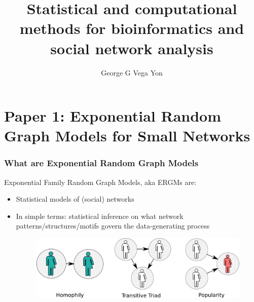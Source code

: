 \documentclass[aspectratio=169, 10pt]{beamer}
\title[Stat. Comp. Bioinf \& SocNets.]{Statistical and computational methods for bioinformatics and social network analysis\linebreak{\small or how did I learn to stop worrying and love the bomb}}
\author[GGVY]{George G Vega Yon}
\institute[USC-PREVMED]{University of Southern California, Department of Preventive Medicine}
\def\cursection{\frame{\tableofcontents[current]}}
\begin{document}


\begin{frame}[noframenumbering]
\maketitle
\end{frame}

\section{Paper 1: Exponential Random Graph Models for Small Networks}
\cursection

\begin{frame}
\frametitle{What are Exponential Random Graph Models}

Exponential Family Random Graph Models, aka ERGMs are:\pause

\begin{itemize}
\item Statistical models of (social) networks\pause
\item In simple terms: statistical inference on what network patterns/structures/motifs
govern the data-generating process
\begin{figure}
\includegraphics[width=.6\linewidth]{friendly-terms.pdf}
\end{figure}
\end{itemize}



\end{frame}
\end{document}
